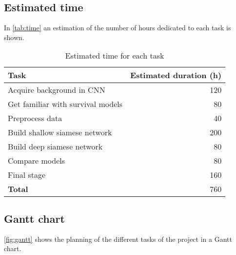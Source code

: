 \subsection{Estimated time}

In \autoref{tab:time} an estimation of the number of hours dedicated to each task is shown.

\begin{table}[H]
  \centering{}
  \begin{tabular}{|l|r|}
    \hline
    Task & Estimated duration (h) \\ \hline \hline
    Acquire background in CNN & 120 \\ \hline
    Get familiar with survival models & 80 \\ \hline
    Preprocess data & 40 \\ \hline
    Build shallow siamese network & 200 \\ \hline
    Build deep siamese network & 80 \\ \hline
    Compare models & 80 \\ \hline
    Final stage & 160 \\ 

  
    \hline \hline
    \textbf{Total} & 760 \\
    \hline
  \end{tabular}
  \caption{Estimated time for each task \label{tab:time}}
\end{table}

\subsection{Gantt chart}

\autoref{fig:gantt} shows the planning of the different tasks of the project in a Gantt chart.


